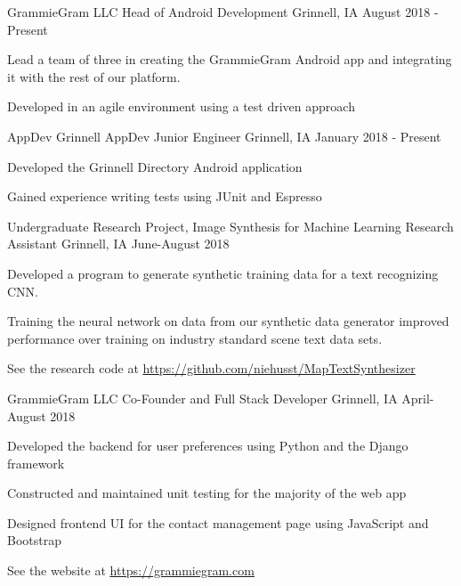 \documentclass[12pt, a4paper]{awesome-cv}
\begin{document}
\begin{cventries}

  \cventry
    {GrammieGram LLC}
    {Head of Android Development}
    {Grinnell, IA}
    {August 2018 - Present}
    {
      \begin{cvitems}
        \item {Lead a team of three in creating the GrammieGram Android app and integrating it with the rest of our platform.}
	\item {Developed in an agile environment using a test driven approach}
      \end{cvitems}
    }

  \cventry
    {AppDev Grinnell}
    {AppDev Junior Engineer}
    {Grinnell, IA}
    {January 2018 - Present}
    {
      \begin{cvitems}
        \item {Developed the Grinnell Directory Android application}
	\item {Gained experience writing tests using JUnit and Espresso}
      \end{cvitems}
    }

  \cventry
    {Undergraduate Research Project, Image Synthesis for Machine Learning}
    {Research Assistant}
    {Grinnell, IA}
    {June-August 2018}
    {
      \begin{cvitems}
        \item {Developed a program to generate synthetic training data for a text recognizing CNN.}
        \item{Training the neural network on data from our synthetic data generator improved performance over training on industry standard scene text data sets.}
	\item{See the research code at \underline{\href{https://github.com/niehusst/MapTextSynthesizer}{https://github.com/niehusst/MapTextSynthesizer}}}
      \end{cvitems}
    }

  \cventry
    {GrammieGram LLC}
    {Co-Founder and Full Stack Developer}
    {Grinnell, IA}
    {April-August 2018}
    {
      \begin{cvitems}
        \item {Developed the backend for user preferences using Python and the Django framework}
        \item {Constructed and maintained unit testing for the majority of the web app}
        \item {Designed frontend UI for the contact management page using JavaScript and Bootstrap}
	\item {See the website at \underline{\href{https://grammiegram.com}{https://grammiegram.com}}}
      \end{cvitems}
    }


\end{cventries}
\end{document}
